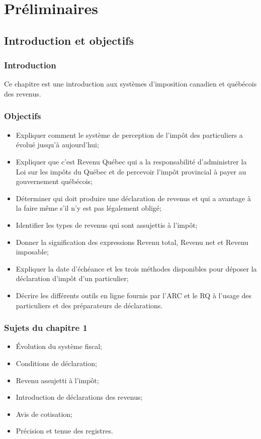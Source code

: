 \chapter{Préliminaires}



\section{Introduction et objectifs}
\subsection{Introduction}
Ce chapitre est une introduction aux systèmes d'imposition canadien et québécois des revenus.


\subsection{Objectifs}
\begin{itemize}
	\item Expliquer comment le système de perception de l'impôt des particuliers a évolué jusqu'à aujourd'hui;
	\item Expliquer que c'est Revenu Québec qui a la responsabilité d'administrer la Loi sur les impôts du Québec et de percevoir l'impôt provincial à payer au gouvernement québécois;
	\item Déterminer qui doit produire une déclaration de revenus et qui a avantage à la faire même s'il n'y est pas légalement obligé;
	\item Identifier les types de revenus qui sont assujettis à l'impôt;
	\item Donner la signification des expressions \og Revenu total\fg{}, \og Revenu net\fg{} et \og Revenu imposable\fg{};
	\item Expliquer la date d'échéance et les trois méthodes disponibles pour déposer la déclaration d'impôt d'un particulier;
	\item Décrire les différents outils en ligne fournis par l'ARC et le RQ à l'usage des particuliers et des préparateurs de déclarations.
\end{itemize}


\subsection{Sujets du chapitre 1}
\begin{itemize}
	\item Évolution du système fiscal;
	\item Conditions de déclaration;
	\item Revenu assujetti à l'impôt;
	\item Introduction de déclarations des revenus;
	\item Avis de cotisation;
	\item Précision et tenue des registres.
\end{itemize}



